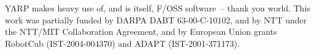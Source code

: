 
YARP makes heavy use of, and is itself, F/OSS software~-- thank you
world.  This work was partially funded by DARPA DABT 63-00-C-10102,
and by NTT under the NTT/MIT Collaboration Agreement, and by European
Union grants RobotCub (IST-2004-004370) and ADAPT (IST-2001-371173).
